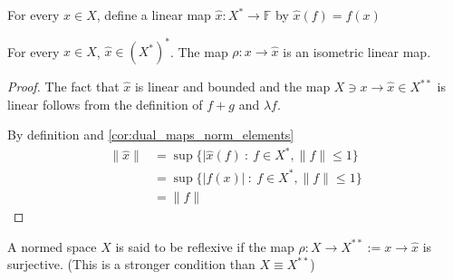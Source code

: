 \begin{definition}
  For every $x \in X$, define a linear map $\hat{x}: X^{*} \to \mathbb{F}$ by $\hat{x}(f) = f(x)$
\end{definition}

\begin{theorem}
  For every $x \in X$, $\hat{ x } \in (X^{*})^{*}$. The map $\rho: x \to \hat{x}$ is an isometric linear map.
\end{theorem}
\begin{proof}
  The fact that $ \hat{x}$ is linear and bounded and the map $X \ni x \to \hat{x} \in X^{**}$ is linear follows from the definition of $f+g$ and $\lambda f$.

  By definition and   \autoref{cor:dual_maps_norm_elements}
  \begin{align*}
    \|\hat{x}\| &= \sup \{ |\hat{x}(f) \ : \ f \in X^{*}, \|f\| \le 1 \} \\ 
    & = \sup \{ |f(x)| \ : \ f \in X^{*}, \|f\| \le 1 \} \\ 
    & = \|f\|
  \end{align*}
\end{proof}

\begin{definition}
  A normed space $X$ is said to be reflexive if the map $\rho: X \to X^{**}:= x \to \hat{x}$ is surjective. (This is a stronger condition than $X \equiv X^{**}$)
\end{definition}

